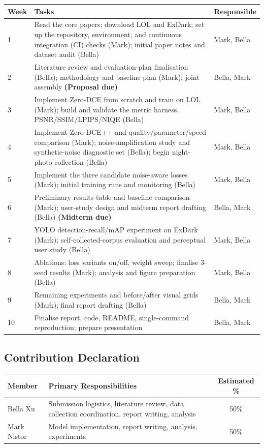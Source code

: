 \documentclass[11pt, letterpaper]{article}
\begin{document}
\begin{center}
\begin{tabular}{lp{9.5cm}l}
\toprule
\textbf{Week} & \textbf{Tasks} & \textbf{Responsible} \\
\midrule
1 & Read the core papers; download LOL and ExDark; set up the repository, environment, and continuous integration (CI) checks (Mark); initial paper notes and dataset audit (Bella) & Mark, Bella \\
2 & Literature review and evaluation-plan finalisation (Bella); methodology and baseline plan (Mark); joint assembly \textbf{(Proposal due)} & Bella, Mark \\
3 & Implement Zero-DCE from scratch and train on LOL (Mark); build and validate the metric harness, PSNR/SSIM/LPIPS/NIQE (Bella) & Mark, Bella \\
4 & Implement Zero-DCE++ and quality/parameter/speed comparison (Mark); noise-amplification study and synthetic-noise diagnostic set (Bella); begin night-photo collection (Bella) & Mark, Bella \\
5 & Implement the three candidate noise-aware losses (Mark); initial training runs and monitoring (Bella) & Mark, Bella \\
6 & Preliminary results table and baseline comparison (Mark); user-study design and midterm report drafting (Bella) \textbf{(Midterm due)} & Bella, Mark \\
7 & YOLO detection-recall/mAP experiment on ExDark (Mark); self-collected-corpus evaluation and perceptual user study (Bella) & Mark, Bella \\
8 & Ablations: loss variants on/off, weight sweep; finalise 3-seed results (Mark); analysis and figure preparation (Bella) & Mark, Bella \\
9 & Remaining experiments and before/after visual grids (Mark); final report drafting (Bella) & Bella, Mark \\
10 & Finalise report, code, README, single-command reproduction; prepare presentation & Bella, Mark \\
\bottomrule
\end{tabular}
\end{center}

\subsection{Contribution Declaration}

\begin{tabular}{lp{10cm}c}
\toprule
\textbf{Member} & \textbf{Primary Responsibilities} & \textbf{Estimated \%} \\
\midrule
{Bella Xu} &   Submission logistics, literature review, data collection coordination, report writing, analysis & 50\%  \\
{Mark Nistor} & Model implementation, report writing, analysis, experiments & 50\%  \\

\bottomrule
\end{tabular}
\end{document}
